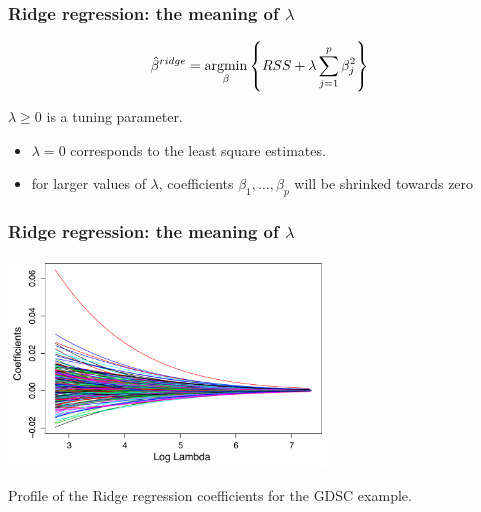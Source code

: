 \documentclass[notes]{beamer}          %
\newcommand{\argmin}{\operatornamewithlimits{argmin}}
\begin{document}
\begin{frame}
\frametitle{Ridge regression: the meaning of $\lambda$}

\begin{equation*}
    \hat{\beta}^{ridge} =  \argmin_{\beta} \left\{ RSS + \lambda \sum_{j=1}^p \beta_j^2 \right\}
\end{equation*}

$\lambda \geq 0$ is a tuning parameter.

\begin{itemize}
    \item $\lambda = 0$ corresponds to the least square estimates.
    \item for larger values of $\lambda$, coefficients $\beta_1, \dots, \beta_p$ will be shrinked towards zero
\end{itemize}
\end{frame}

\begin{frame}
\frametitle{Ridge regression: the meaning of $\lambda$}


\begin{center}

\includegraphics[height=5.5cm]{../figures/week_2_linear_models/Ridge_regression_coefficinets.pdf}
\end{center}

Profile of the Ridge regression coefficients for the GDSC example.

\end{frame}
\end{document}
